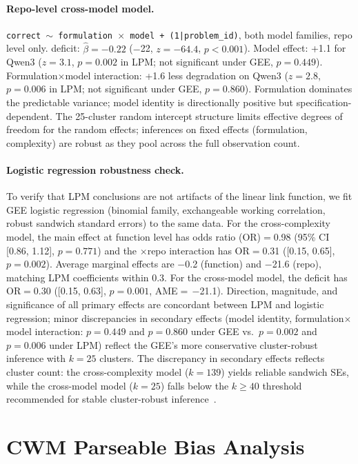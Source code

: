 \paragraph{Repo-level cross-model model.} \texttt{correct $\sim$ formulation $\times$ model + (1|problem\_id)}, both model families, repo level only. \cwm{} deficit: $\hat{\beta}{=}-0.22$ ($-$22\pp{}, $z{=}-64.4$, $p{<}0.001$). Model effect: +1.1\pp{} for Qwen3 ($z{=}3.1$, $p{=}0.002$ in LPM; not significant under GEE, $p{=}0.449$). Formulation$\times$model interaction: +1.6\pp{} less \cwm{} degradation on Qwen3 ($z{=}2.8$, $p{=}0.006$ in LPM; not significant under GEE, $p{=}0.860$). Formulation dominates the predictable variance; model identity is directionally positive but specification-dependent. The 25-cluster random intercept structure limits effective degrees of freedom for the random effects; inferences on fixed effects (formulation, complexity) are robust as they pool across the full observation count.

\paragraph{Logistic regression robustness check.} To verify that LPM conclusions are not artifacts of the linear link function, we fit GEE logistic regression (binomial family, exchangeable working correlation, robust sandwich standard errors) to the same data. For the cross-complexity model, the \cwm{} main effect at function level has odds ratio (OR)$=$0.98 (95\% CI [0.86, 1.12], $p{=}0.771$) and the \cwm{}$\times$repo interaction has OR$=$0.31 ([0.15, 0.65], $p{=}0.002$). Average marginal effects are $-$0.2\pp{} (function) and $-$21.6\pp{} (repo), matching LPM coefficients within 0.3\pp{}. For the cross-model model, the \cwm{} deficit has OR$=$0.30 ([0.15, 0.63], $p{=}0.001$, AME$=$\,$-$21.1\pp{}). Direction, magnitude, and significance of all primary effects are concordant between LPM and logistic regression; minor discrepancies in secondary effects (model identity, formulation$\times$model interaction: $p{=}0.449$ and $p{=}0.860$ under GEE vs.\ $p{=}0.002$ and $p{=}0.006$ under LPM) reflect the GEE's more conservative cluster-robust inference with $k{=}25$ clusters. The discrepancy in secondary effects reflects cluster count: the cross-complexity model ($k{=}139$) yields reliable sandwich SEs, while the cross-model model ($k{=}25$) falls below the $k{\geq}40$ threshold recommended for stable cluster-robust inference~\cite{cameron2008bootstrap}.

\section{CWM Parseable Bias Analysis}
\label{app:parseable_bias}

